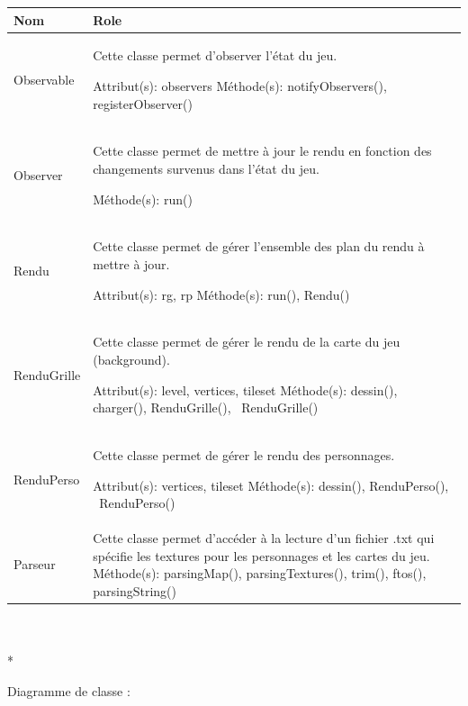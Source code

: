 \documentclass[11pt, a4paper]{article}
\begin{document}
\begin{tabularx}{\textwidth}{ |l|X| }
\hline
   \textbf{Nom} & \textbf{Role}
 \\
\hline

   Observable & Cette classe permet d'observer l'état du jeu.

Attribut(s): observers
\newline
Méthode(s): notifyObservers(), registerObserver()
 \\
\hline

   Observer & Cette classe permet de mettre à jour le rendu en fonction des changements survenus dans l'état du jeu.
   
Méthode(s): run()
 \\
\hline

   Rendu & Cette classe permet de gérer l'ensemble des plan du rendu à mettre à jour.

Attribut(s): rg, rp
\newline
Méthode(s): run(), Rendu()
 \\
\hline

   RenduGrille & Cette classe permet de gérer le rendu de la carte du jeu (background).

Attribut(s): level, vertices, tileset
\newline
Méthode(s): dessin(), charger(), RenduGrille(), ~RenduGrille()
 \\
\hline

   RenduPerso & Cette classe permet de gérer le rendu des personnages.

Attribut(s): vertices, tileset
\newline
Méthode(s): dessin(), RenduPerso(), ~RenduPerso()
 \\
\hline

   Parseur & Cette classe permet d’accéder à la lecture d’un fichier .txt qui spécifie les textures pour les personnages et les cartes du jeu.
\newline
Méthode(s): parsingMap(), parsingTextures(), trim(), ftos(), parsingString()
 \\
\hline

\end{tabularx}\\ \\*

Diagramme de classe :
\end{document}
